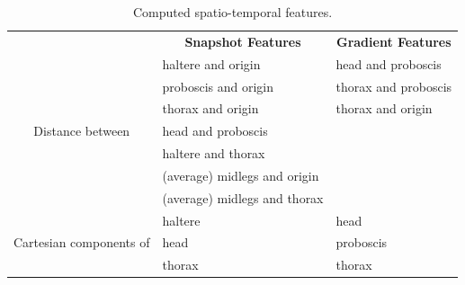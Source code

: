 \begin{table}[htb!]
	\begin{adjustbox}{width=1\textwidth}
		\begin{tabular}{c l l}
			\toprule
			                                         & \multicolumn{1}{c}{\textbf{Snapshot Features}} & \multicolumn{1}{c}{\textbf{Gradient Features}} \\
			\cmidrule(lr){2-2}\cmidrule(lr){3-3}
			\multirow{7}{*}{Distance between}        & haltere and origin                             & head and proboscis                             \\
			                                         & proboscis and origin                           & thorax and proboscis                           \\
			                                         & thorax and origin                              & thorax and origin                              \\
			                                         & head and proboscis                             &                                                \\
			                                         & haltere and thorax                             &                                                \\
			                                         & (average) midlegs and origin                   &                                                \\
			                                         & (average) midlegs and thorax                   &                                                \\
			\cmidrule(lr){2-2}\cmidrule(lr){3-3}
			\multirow{3}{*}{Cartesian components of} & haltere                                        & head                                           \\
			                                         & head                                           & proboscis                                      \\
			                                         & thorax                                         & thorax                                         \\
			\bottomrule
		\end{tabular}
	\end{adjustbox}
	\caption{Computed spatio-temporal features. \label{table:spatiotemporal-features}}
\end{table}

